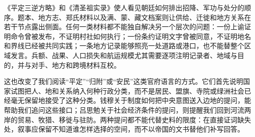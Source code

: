 《平定三逆方略》和《清圣祖实录》使人看见朝廷如何排出招降、军功与处分的顺序。题本、地方志、郑氏材料以及满、蒙、藏文档案则让供给、迁徙和地方关系在若干节点露出侧面。任何一类材料都不能独自解决另一个层次的问题：一份上谕证明命令曾被发布，不证明村社如何执行；一份条约证明文字曾被同意，不证明地名和界线已经被共同实践；一条地方记录能够照亮一处道路或港口，也不能替整个区域发言。兵额、战果、人口损失和航运规模尤其需要逐项注明记录者、地域与目的，并与对手、地方和跨境材料互校。

这也改变了我们阅读“平定”“归附”或“安民”这类官府语言的方式。它们首先说明国家试图把人、地和关系纳入何种行政分类，而不是居民、盟旗、寺院或绿洲社会已经毫无保留地接受了这种分类。钱穆关于制度如何把中央意图送入边地的提问，能帮助我们追问这些接口；吕思勉关于社会经济条件的提问，则提醒我们回到河流两岸的贸易、牧猎、移徙与驻防。两种提问都不能代替史料的限度：在直接证词缺失处，叙事应保留不知道谁怎样选择的空间，而不以帝国的文书替他们补写回答。

